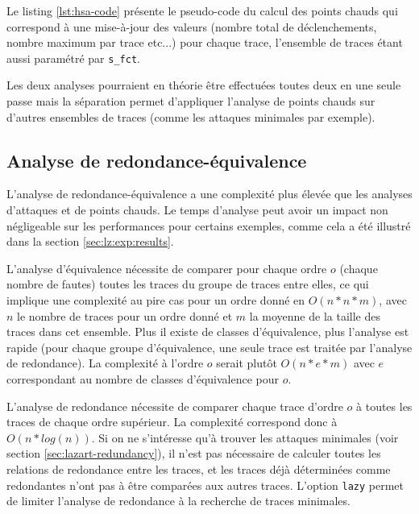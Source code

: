             Le listing \ref{lst:hsa-code} présente le pseudo-code du calcul des points chauds qui correspond à une mise-à-jour des valeurs (nombre total de déclenchements, nombre maximum par trace etc...) pour chaque trace, l'ensemble de traces étant aussi paramétré par \texttt{s\_fct}.
 		    
            Les deux analyses pourraient en théorie être effectuées toutes deux en une seule passe mais la séparation permet d'appliquer l'analyse de points chauds sur d'autres ensembles de traces (comme les attaques minimales par exemple).
 		    
        \subsection{Analyse de redondance-équivalence}
        \label{sec:lazart-impl-analysis-aar}
            
            L'analyse de redondance-équivalence a une complexité plus élevée que les analyses d'attaques et de points chauds.
            Le temps d'analyse peut avoir un impact non négligeable sur les performances pour certains exemples, comme cela a été illustré dans la section \ref{sec:lz:exp:results}.
            
            L'analyse d'équivalence nécessite de comparer pour chaque ordre $o$ (chaque nombre de fautes) toutes les traces du groupe de traces entre elles, ce qui implique une complexité au pire cas pour un ordre donné en $O(n * n * m)$, avec $n$ le nombre de traces pour un ordre donné et $m$ la moyenne de la taille des traces dans cet ensemble. 
            Plus il existe de classes d'équivalence, plus l'analyse est rapide (pour chaque groupe d'équivalence, une seule trace est traitée par l'analyse de redondance). La complexité à l'ordre $o$ serait plutôt $O(n * e * m)$ avec $e$ correspondant au nombre de classes d'équivalence pour $o$. 
            
            L'analyse de redondance nécessite de comparer chaque trace d'ordre $o$ à toutes les traces de chaque ordre supérieur.
            La complexité correspond donc à $O(n * log(n))$.
            Si on ne s'intéresse qu'à trouver les attaques minimales (voir section \ref{sec:lazart-redundancy}), il n'est pas nécessaire de calculer toutes les relations de redondance entre les traces, et les traces déjà déterminées comme redondantes n'ont pas à être comparées aux autres traces.
            L'option \texttt{lazy} permet de limiter l'analyse de redondance à la recherche de traces minimales. 
       
